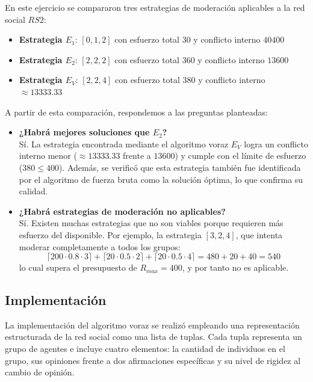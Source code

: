 \documentclass[11pt,letter]{article}
\begin{document}
En este ejercicio se compararon tres estrategias de moderación aplicables a la red social $RS2$:

\begin{itemize}
    \item \textbf{Estrategia $E_1$}: $[0, 1, 2]$ con esfuerzo total $30$ y conflicto interno $40400$
    \item \textbf{Estrategia $E_2$}: $[2, 2, 2]$ con esfuerzo total $360$ y conflicto interno $13600$
    \item \textbf{Estrategia $E_{V}$}: $[2, 2, 4]$ con esfuerzo total $380$ y conflicto interno $\approx 13333.33$
\end{itemize}

A partir de esta comparación, respondemos a las preguntas planteadas:

\begin{itemize}
    \item \textbf{¿Habrá mejores soluciones que $E_2$?} \\
    Sí. La estrategia encontrada mediante el algoritmo voraz $E_V$ logra un conflicto interno menor ($\approx 13333.33$ frente a $13600$) y cumple con el límite de esfuerzo ($380 \leq 400$). Además, se verificó que esta estrategia también fue identificada por el algoritmo de fuerza bruta como la solución óptima, lo que confirma su calidad.

    \item \textbf{¿Habrá estrategias de moderación no aplicables?} \\
    Sí. Existen muchas estrategias que no son viables porque requieren más esfuerzo del disponible. Por ejemplo, la estrategia $[3, 2, 4]$, que intenta moderar completamente a todos los grupos:
    \[
    \lceil 200 \cdot 0.8 \cdot 3 \rceil + \lceil 20 \cdot 0.5 \cdot 2 \rceil + \lceil 20 \cdot 0.5 \cdot 4 \rceil = 480 + 20 + 40 = 540
    \]
    lo cual supera el presupuesto de $R_{max} = 400$, y por tanto no es aplicable.
\end{itemize}


    \subsection{Implementación}

    La implementación del algoritmo voraz se realizó empleando una representación estructurada de la red social como una lista de tuplas. Cada tupla representa un grupo de agentes e incluye cuatro elementos: la cantidad de individuos en el grupo, sus opiniones frente a dos afirmaciones específicas y su nivel de rigidez al cambio de opinión.
\end{document}
